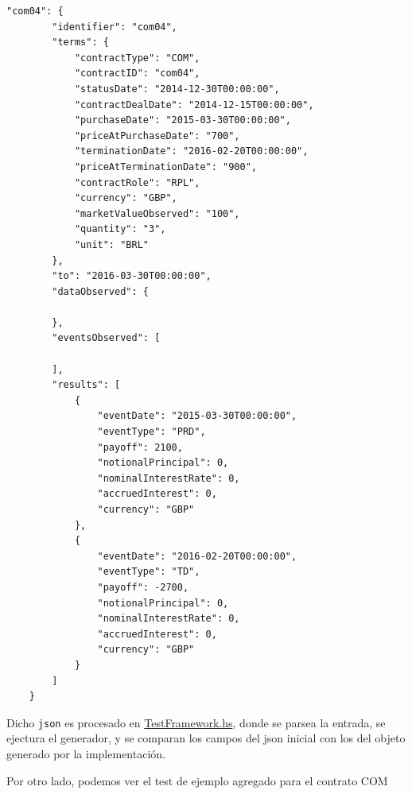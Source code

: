 \documentclass[12pt]{book}
\begin{document}
\begin{lstlisting}[style=Haskell-cardano, caption=Test propuesto por ACTUS para el contrato COM. Se pueden ovservar tanto los términos como eventos observados y los eventos que se esperá que la implementación genere.]
"com04": {
        "identifier": "com04",
        "terms": {
            "contractType": "COM",
            "contractID": "com04",
            "statusDate": "2014-12-30T00:00:00",
            "contractDealDate": "2014-12-15T00:00:00",
            "purchaseDate": "2015-03-30T00:00:00",
            "priceAtPurchaseDate": "700",
            "terminationDate": "2016-02-20T00:00:00",
            "priceAtTerminationDate": "900",
            "contractRole": "RPL",
            "currency": "GBP",
            "marketValueObserved": "100",
            "quantity": "3",
            "unit": "BRL"
        },
        "to": "2016-03-30T00:00:00",
        "dataObserved": {

        },
        "eventsObserved": [

        ],
        "results": [
            {
                "eventDate": "2015-03-30T00:00:00",
                "eventType": "PRD",
                "payoff": 2100,
                "notionalPrincipal": 0,
                "nominalInterestRate": 0,
                "accruedInterest": 0,
                "currency": "GBP"
            },
            {
                "eventDate": "2016-02-20T00:00:00",
                "eventType": "TD",
                "payoff": -2700,
                "notionalPrincipal": 0,
                "nominalInterestRate": 0,
                "accruedInterest": 0,
                "currency": "GBP"
            }
        ]
    }
\end{lstlisting}

Dicho \texttt{json} es procesado en \href{https://github.com/input-output-hk/marlowe-cardano/blob/main/marlowe-actus/test/Spec/Marlowe/ACTUS/TestFramework.hs}{TestFramework.hs}, donde se parsea la entrada, se ejectura el generador, y se comparan los campos del json inicial con los del objeto generado por la implementación.

Por otro lado, podemos ver el test de ejemplo agregado para el contrato COM 
\end{document}
